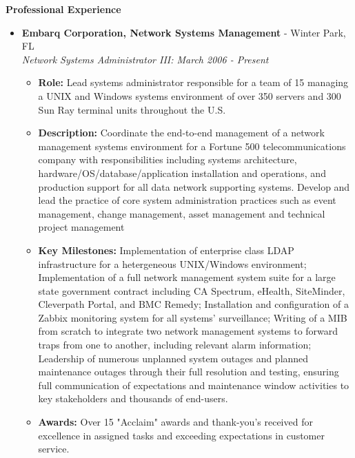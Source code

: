 \documentclass[10pt,oneside]{article}
\newenvironment{ressection}[1]{
	\vspace{4pt}
	\textbf{\selectfont\normalsize#1}
	\begin{itemize}
	\vspace{3pt}
}{
	\end{itemize}
}
\newcommand{\ressubitem}[1]{
	\vspace{-1pt}
	\item \begin{flushleft} #1 \end{flushleft}
}
\newcommand{\resbigitem}[3]{
	\vspace{-5pt}
	\item
	\textbf{#1} - #2 \\
	\textit{#3}
}
\newenvironment{ressubsec}[3]{
	\resbigitem{#1}{#2}{#3}
	\vspace{-2pt}
	\begin{itemize}
}{
	\end{itemize}
}
\begin{document}

\begin{ressection}{Professional Experience}

	\begin{ressubsec}{Embarq Corporation, Network Systems Management}{Winter Park, FL}{Network Systems Administrator III: March 2006 - Present}
		\ressubitem{\textbf{Role:} Lead systems administrator responsible for a team of 15 managing a UNIX and Windows systems environment of over 350 servers and 300 Sun Ray terminal units throughout the U.S.}
		
		\ressubitem{\textbf{Description:} Coordinate the end-to-end management of a network management systems environment for a Fortune 500 telecommunications company with responsibilities including systems architecture, hardware/OS/database/application installation and operations, and production support for all data network supporting systems.  Develop and lead the practice of core system administration practices such as event management, change management, asset management and technical project management}

		\ressubitem{\textbf{Key Milestones:} Implementation of enterprise class LDAP infrastructure for a hetergeneous UNIX/Windows environment; Implementation of a full network management system suite for a large state government contract including CA Spectrum, eHealth, SiteMinder, Cleverpath Portal, and BMC Remedy; Installation and configuration of a Zabbix monitoring system for all systems' surveillance; Writing of a MIB from scratch to integrate two network management systems to forward traps from one to another, including relevant alarm information; Leadership of numerous unplanned system outages and planned maintenance outages through their full resolution and testing, ensuring full communication of expectations and maintenance window activities to key stakeholders and thousands of end-users.}
		
		\ressubitem{\textbf{Awards:} Over 15 "Acclaim" awards and thank-you's received for excellence in assigned tasks and exceeding expectations in customer service.}

	\end{ressubsec}


\end{ressection}
\end{document}

